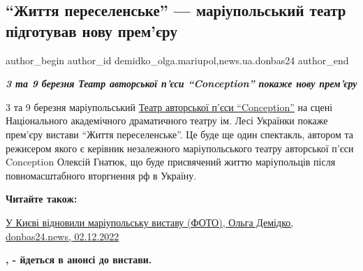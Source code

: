  
 
 
 
 
 
\subsection{\enquote{Життя переселенське} — маріупольський театр підготував нову прем'єру}
\label{sec:28_02_2023.stz.news.ua.donbas24.1.zhyttja_pereselenske_premjera}
 
\ifcmt
 author_begin
   author_id demidko_olga.mariupol,news.ua.donbas24
 author_end
\fi

\begin{center}
  \em\color{blue}\bfseries\Large
  3 та 9 березня Театр авторської п'єси \enquote{Conception} покаже нову прем'єру 
\end{center}

3 та 9 березня маріупольський
\href{https://archive.org/search?query=subject\%3A"Театр+Conception+Маріуполь"}{Театр авторської
п'єси \enquote{Conception}} на сцені
Національного академічного драматичного театру ім. Лесі Українки покаже
прем'єру вистави \enquote{Життя переселенське}. Це буде ще один спектакль, автором та
режисером якого є керівник незалежного маріупольського театру авторської п'єси
Conception Олексій Гнатюк, що буде присвячений життю маріупольців після
повномасштабного вторгнення рф в Україну. 

\textbf{Читайте також:} 

\href{https://donbas24.news/news/u-kijevi-vidnovili-mariupolsku-vistavu}{%
У Києві відновили маріупольську виставу (ФОТО), Ольга Демідко, donbas24.news, 02.12.2022}

\begin{leftbar}
	\begingroup
		\bfseries
{}, - йдеться в анонсі
до вистави. 
	\endgroup
\end{leftbar}

